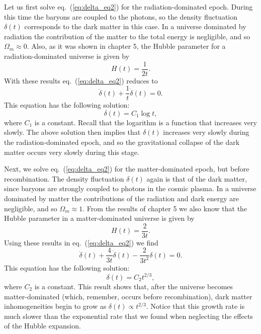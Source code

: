 \documentclass[11pt, a4paper,oneside,openright]{book}
\numberwithin{equation}{section}
\begin{document}
Let us first solve eq.\ (\ref{eq:delta_eq2}) for the radiation-dominated epoch. During this time the baryons are coupled to the photons, so the density fluctuation $\delta(t)$ corresponds to the dark matter in this case. In a universe dominated by radiation the contribution of the matter to the total energy is negligible, and so $\Omega_m\approx0$. Also, as it was shown in chapter 5, the Hubble parameter for a radiation-dominated universe is given by
\begin{equation}
H(t)=\frac{1}{2t}.
\end{equation}
With these results eq.\ (\ref{eq:delta_eq2}) reduces to
\begin{equation} \label{eq:delta_eq_rad}
\ddot{\delta}(t)+\frac{1}{t}\dot{\delta}(t)=0.
\end{equation}
This equation has the following solution:
\begin{equation}
\delta(t)=C_1\log t,
\end{equation}
where $C_1$ is a constant. Recall that the logarithm is a function that increases very slowly. The above solution then implies that $\delta(t)$ increases very slowly during the radiation-dominated epoch, and so the gravitational collapse of the dark matter occurs very slowly during this stage.

Next, we solve eq.\ (\ref{eq:delta_eq2}) for the matter-dominated epoch, but before recombination. The density fluctuation $\delta(t)$ again is that of the dark matter, since baryons are strongly coupled to photons in the cosmic plasma. In a universe dominated by matter the contributions of the radiation and dark energy are negligible, and so $\Omega_m\approx 1$. From the results of chapter 5 we also know that the Hubble parameter in a matter-dominated universe is given by
\begin{equation}
H(t)=\frac{2}{3t}.
\end{equation}
Using these results in eq.\ (\ref{eq:delta_eq2}) we find
\begin{equation} \label{eq:delta_eq_mat}
\ddot{\delta}(t)+\frac{4}{3t}\dot{\delta}(t)-\frac{2}{3t^2}\delta(t)=0.
\end{equation}
This equation has the following solution:
\begin{equation}
\delta(t)=C_2t^{2/3},
\end{equation}
where $C_2$ is a constant. This result shows that, after the universe becomes matter-dominated (which, remember, occurs before recombination), dark matter inhomogeneities begin to grow as $\delta(t)\propto t^{2/3}$. Notice that this growth rate is much slower than the exponential rate that we found when neglecting the effects of the Hubble expansion.
\end{document}
